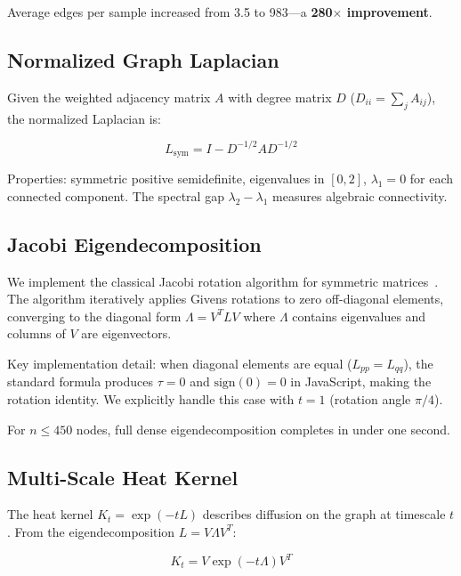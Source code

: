 \documentclass{../yalumba}
\begin{document}
Average edges per sample increased from 3.5 to 983---a \textbf{280$\times$
improvement}.

\subsection{Normalized Graph Laplacian}

Given the weighted adjacency matrix $A$ with degree matrix $D$
($D_{ii} = \sum_j A_{ij}$), the normalized Laplacian is:

\begin{equation}
  L_{\text{sym}} = I - D^{-1/2} A D^{-1/2}
  \label{eq:laplacian}
\end{equation}

Properties: symmetric positive semidefinite, eigenvalues in $[0, 2]$,
$\lambda_1 = 0$ for each connected component.  The spectral gap
$\lambda_2 - \lambda_1$ measures algebraic connectivity.

\subsection{Jacobi Eigendecomposition}

We implement the classical Jacobi rotation algorithm for symmetric
matrices~\cite{efron1979bootstrap}.  The algorithm iteratively applies Givens
rotations to zero off-diagonal elements, converging to the diagonal form
$\Lambda = V^T L V$ where $\Lambda$ contains eigenvalues and columns of $V$
are eigenvectors.

Key implementation detail: when diagonal elements are equal
($L_{pp} = L_{qq}$), the standard formula produces $\tau = 0$ and
$\text{sign}(0) = 0$ in JavaScript, making the rotation identity.  We
explicitly handle this case with $t = 1$ (rotation angle $\pi/4$).

For $n \leq 450$ nodes, full dense eigendecomposition completes in under one
second.

\subsection{Multi-Scale Heat Kernel}

The heat kernel $K_t = \exp(-tL)$ describes diffusion on the graph at
timescale $t$.  From the eigendecomposition $L = V \Lambda V^T$:

\begin{equation}
  K_t = V \exp(-t\Lambda) V^T
  \label{eq:heat-kernel}
\end{equation}
\end{document}
